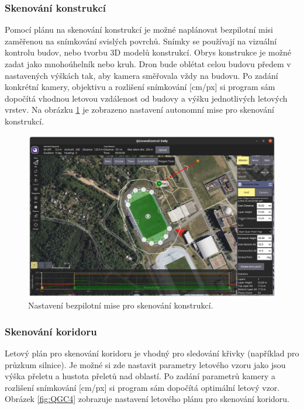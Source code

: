 \subsubsection{Skenování konstrukcí}

Pomocí plánu na skenování konstrukcí je možné naplánovat bezpilotní misi zaměřenou na snímkování svislých povrchů. Snímky se používají na vizuální kontrolu budov, nebo tvorbu 3D modelů konstrukcí. Obrys konstrukce je možné zadat jako mnohoúhelník nebo kruh. Dron bude oblétat celou budovu předem v nastavených výškách tak, aby kamera směřovala vždy na budovu. Po zadání konkrétní kamery, objektivu a rozlišení snímkování [cm/px] si program sám dopočítá vhodnou letovou vzdálenost od budovy a výšku jednotlivých letových vrstev. Na obrázku \ref{fig:QGC3} je zobrazeno nastavení autonomní mise pro skenování konstrukcí.

\begin{figure}[!ht]
    \begin{center}
        \includegraphics[scale=0.34]{obrazky/QGC5}
    \end{center}
    \caption[Nastavení bezpilotní mise pro skenování konstrukcí]{Nastavení bezpilotní mise pro skenování konstrukcí.}
    \label{fig:QGC3}
\end{figure}

\subsubsection{Skenování koridoru}

Letový plán pro skenování koridoru je vhodný pro sledování křivky (například pro průzkum silnice). Je možné si zde nastavit parametry letového vzoru jako jsou výška přeletu a hustota přeletů nad oblastí. Po zadání parametrů kamery a rozlišení snímkování [cm/px] si program sám dopočítá optimální letový vzor. Obrázek \ref{fig:QGC4} zobrazuje nastavení letového plánu pro skenování koridoru.

